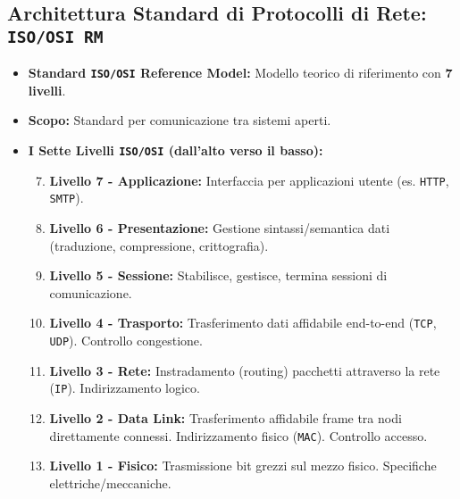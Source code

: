 \documentclass{article}
\begin{document}
\subsection{Architettura Standard di Protocolli di Rete: \texttt{ISO/OSI RM}}
\begin{itemize}
    \item \textbf{Standard \texttt{ISO/OSI} Reference Model:} Modello teorico di riferimento con \textbf{7 livelli}.
    \item \textbf{Scopo:} Standard per comunicazione tra sistemi aperti.
    \item \textbf{I Sette Livelli \texttt{ISO/OSI} (dall'alto verso il basso):}
    \begin{enumerate}[label=\arabic*.]
        \setcounter{enumi}{6} %
        \item \textbf{Livello 7 - Applicazione:} Interfaccia per applicazioni utente (es. \texttt{HTTP}, \texttt{SMTP}).
        \item \textbf{Livello 6 - Presentazione:} Gestione sintassi/semantica dati (traduzione, compressione, crittografia).
        \item \textbf{Livello 5 - Sessione:} Stabilisce, gestisce, termina sessioni di comunicazione.
        \item \textbf{Livello 4 - Trasporto:} Trasferimento dati affidabile end-to-end (\texttt{TCP}, \texttt{UDP}). Controllo congestione.
        \item \textbf{Livello 3 - Rete:} Instradamento (routing) pacchetti attraverso la rete (\texttt{IP}). Indirizzamento logico.
        \item \textbf{Livello 2 - Data Link:} Trasferimento affidabile frame tra nodi direttamente connessi. Indirizzamento fisico (\texttt{MAC}). Controllo accesso.
        \item \textbf{Livello 1 - Fisico:} Trasmissione bit grezzi sul mezzo fisico. Specifiche elettriche/meccaniche.
    \end{enumerate}
\end{itemize}
\end{document}
